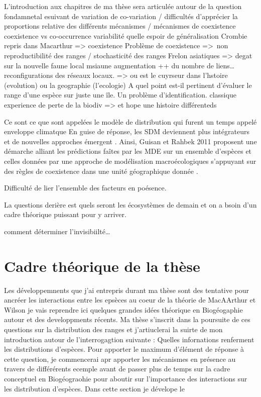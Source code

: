 L'introduction aux chapitres de ma thèse sera articulée autour de la
question fondamnetal esuivant de variation de co-variation / difficultés
d'apprécier la proportions relative des différents mécanismes /
mécanismes de coexistence coexistence vs co-occurrence variabilité
quelle espoir de généralisation Crombie repris dans Macarthur
=\textgreater{} coexistence Problème de coexistence =\textgreater{}~non
reproductibilité des ranges / stochasticité des ranges Frelon asiatiques
=\textgreater{} degat sur la nouvelle faune local msiaune augmentation
++ du nombre de liens\ldots{} reconfigurations des réseaux locaux.
=\textgreater{} ou est le cuyrseur dans l'hstoire (evolution) ou la
geographie (l'ecologie) A quel point est-il pertinent d'évaluer le range
d'une espèce sur juste une île. Un problème d'identification. classique
experience de perte de la biodiv =\textgreater{} et hope une histoire
différenteds

Ce sont ce que sont appelées le modèle de distribution qui furent un
temps appelé enveloppe climatque En guise de réponse, les SDM deviennent
plus intégrateurs et de nouvelles approches émergent
\cite{Kissling2011}. Ainsi, Guisan et Rahbek 2011 proposent une démarche
alliant les prédictions faîtes par les MDE sur un ensemble d'espèces et
celles données par une approche de modélisation macroécologiques
s'appuyant sur des règles de coexistence dans une unité géographique
donnée \cite{Guisan2011}.

Difficulté de lier l'ensemble des facteurs en poésence.

La questions derière est quels seront les écosystèmes de demain et on a
bsoin d'un cadre théorique puissant pour y arriver.

comment déterminer l'invisibiilté\ldots{}

\section*{Cadre théorique de la
thèse}\label{cadre-thuxe9orique-de-la-thuxe8se}

Les développemnents que j'ai entrepris durant ma thèse sont des
tentative pour ancréer les interactions entre les epsèces au coeur de la
théorie de MacAArthur et Wilson je vais reprendre ici quelques grandes
idées théorique en Biogéogaphie autour et des developpments récents. Ma
thèse s'inscrit dans la poursuite de ces questions sur la distribution
des ranges et j'artiuclerai la suirte de mon introduction autour de
l'interrogagtion suivante : Quelles infornations renferment les
distributions d'espèces. Pour apporter le maximum d'élément de réponse à
cette question, je commencerai apr apporter les mécanismes en présence
au travers de différérents ecemple avant de passer plus de temps sur la
cadre conceptuel en Biogéograohie pour aboutir sur l'importance des
interactions sur les distribution d'espèces. Dans cette section je
dévelope le

